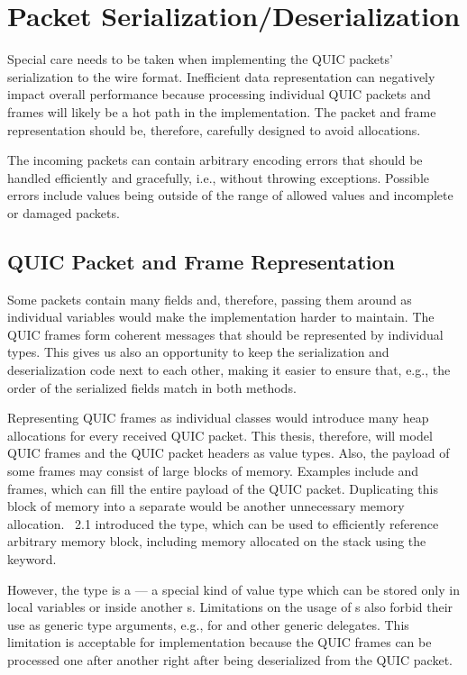 \section{Packet Serialization/Deserialization}

Special care needs to be taken when implementing the QUIC packets' serialization to the wire format.
Inefficient data representation can negatively impact overall performance because processing
individual QUIC packets and frames will likely be a hot path in the implementation. The packet and
frame representation should be, therefore, carefully designed to avoid allocations.

The incoming packets can contain arbitrary encoding errors that should be handled efficiently and
gracefully, i.e., without throwing exceptions. Possible errors include values being outside of the
range of allowed values and incomplete or damaged packets.

\subsection{QUIC Packet and Frame Representation}\label{sec:03-data-representation}

Some packets contain many fields and, therefore, passing them around as individual variables would
make the implementation harder to maintain. The QUIC frames form coherent messages that should be
represented by individual \dotnet{} types. This gives us also an opportunity to keep the
serialization and deserialization code next to each other, making it easier to ensure that, e.g.,
the order of the serialized fields match in both methods.

Representing QUIC frames as individual classes would introduce many heap allocations for every
received QUIC packet. This thesis, therefore, will model QUIC frames and the QUIC packet headers as
value types. Also, the payload of some frames may consist of large blocks of memory. Examples
include \STREAM{} and \CRYPTO{} frames, which can fill the entire payload of the QUIC packet.
Duplicating this block of memory into a separate \ArrayOf{\byte{}} would be another unnecessary memory
allocation. \dotnet{}~2.1 introduced the  type, which can be used to efficiently
reference arbitrary memory block, including memory allocated on the stack using the
 keyword.

However, the  type is a  --- a special kind of value type which
can be stored only in local variables or inside another s. Limitations on the
usage of s also forbid their use as generic type arguments, e.g., for
\FuncOf{} and other generic delegates. This limitation is acceptable for \QuicConnection{}
implementation because the QUIC frames can be processed one after another right after being
deserialized from the QUIC packet.

